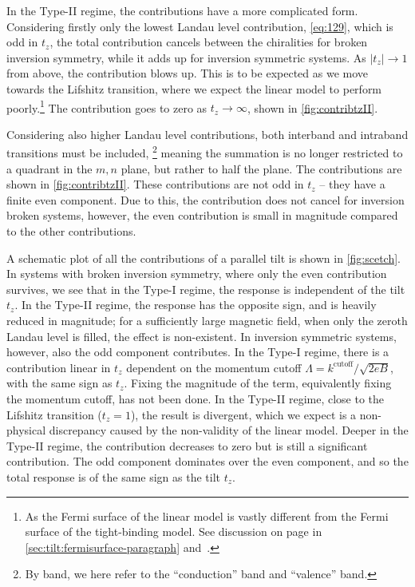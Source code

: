 In the Type-II regime, the contributions have a more complicated form.
Considering firstly only the lowest Landau level contribution, \cref{eq:129}, which is odd in \( t_z \), the total contribution cancels between the chiralities for broken inversion symmetry, while it adds up for inversion symmetric systems.
As \( |t_z| \to 1 \) from above, the contribution blows up.
This is to be expected as we move towards the Lifshitz transition, where we expect the linear model to perform poorly.\footnote{As the Fermi surface of the linear model is vastly different from the Fermi surface of the tight-binding model.
See discussion on page \pageref{sec:tilt:fermisurface-paragraph} in \cref{sec:tilt:fermisurface-paragraph} and~\textcite{vanderwurffMagnetovorticalThermoelectricTransport2019}.}
The contribution goes to zero as \( t_z \to \infty \), shown in \cref{fig:contribtzII}.

Considering also higher Landau level contributions, both interband and intraband transitions must be included,%
\footnote{By band, we here refer to the ``conduction'' band and ``valence'' band.}
meaning the summation is no longer restricted to a quadrant in the \( m,n \) plane, but rather to half the plane.
The contributions are shown in \cref{fig:contribtzII}.
These contributions are not odd in \( t_z \) -- they have a finite even component.
Due to this, the contribution does not cancel for inversion broken systems, however, the even contribution is small in magnitude compared to the other contributions.

A schematic plot of all the contributions of a parallel tilt is shown in \cref{fig:scetch}.
In systems with broken inversion symmetry, where only the even contribution survives, we see that in the Type-I regime, the response is independent of the tilt \( t_z \).
In the Type-II regime, the response has the opposite sign, and is heavily reduced in magnitude;
for a sufficiently large magnetic field, when only the zeroth Landau level is filled, the effect is non-existent.
In inversion symmetric systems, however, also the odd component contributes.
In the Type-I regime, there is a contribution linear in \( t_z \) dependent on the momentum cutoff \( \Lambda = k^{\text{cutoff}} /\sqrt{2 eB}   \), with the same sign as \( t_z \).
Fixing the magnitude of the term, equivalently fixing the momentum cutoff, has not been done.
In the Type-II regime, close to the Lifshitz transition (\( t_z = 1 \)), the result is divergent, which we expect is a non-physical discrepancy caused by the non-validity of the linear model.
Deeper in the Type-II regime, the contribution decreases to zero but is still a significant contribution.
The odd component dominates over the even component, and so the total response is of the same sign as the tilt \( t_z \).

